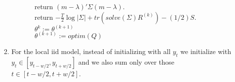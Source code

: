 \documentclass[paper=a4, fontsize=11pt]{scrartcl}
\begin{document}
\begin{enumerate}
\begin{enumerate}[1]
\begin{enumerate}[a.]
\begin{enumerate}[I.]
\begin{tabbing}
                  \hspace{3cm} return $(m - \lambda)'\Sigma(m - \lambda)$. \\
                  \hspace{2cm} return $-\frac{T}{2}\log{|\Sigma|} + tr(solve(\Sigma)R^{(k)}) - (1/2)S$. \\
                  \hspace{1cm} $\theta^{k} := \theta^{(k+1)}$ \\
                  \hspace{1cm} $\theta^{(k+1)} := optim(Q)$
                \end{tabbing}
            \end{enumerate}
        \end{enumerate}
      \item For the local iid model, instead of initializing with all $y_t$ we initialize with $y_t \in [y_{t - w/2}, y_{t+w/2}]$ and we also sum only over those $t \in [t - w/2, t + w/2]$.
    \end{enumerate}
\end{enumerate}
\end{document}
